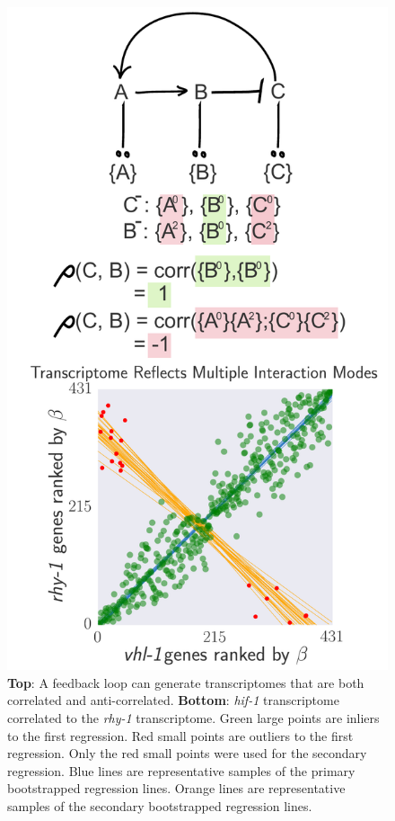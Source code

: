 \documentclass[9pt,twocolumn,twoside]{pnas-new}
\newcommand{\rhy}{\emph{rhy-1}}
\newcommand{\hif}{\emph{hif-1}}
\begin{document}
\begin{figure}[tbhp]
\centering
\includegraphics[width=\linewidth]{figs/correlative_genetics2.pdf}
\caption{\textbf{Top}: A feedback loop can generate transcriptomes that are both correlated and anti-correlated. \textbf{Bottom}: \hif{} transcriptome correlated to the \rhy{} transcriptome. Green large points are inliers to the first regression. Red small points are outliers to the first regression. Only the red small points were used for the secondary regression. Blue lines are representative samples of the primary bootstrapped regression lines. Orange lines are representative samples of the secondary bootstrapped regression lines.}
\label{fig:xpattern}
\end{figure}
\end{document}
